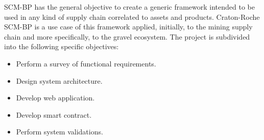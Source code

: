 \label{chap:Technical}

\acresetall 

\ac{SCM-BP} has the general objective to create a generic framework intended to be used in any kind of supply chain correlated to assets and products. Craton-Roche SCM-BP is a use case of this framework applied, initially, to the mining supply chain and more specifically, to the gravel ecosystem. The project is subdivided into the following specific objectives:
\begin{itemize}
\item Perform a survey of functional requirements.
\item Design system architecture.
\item Develop web application.
\item Develop smart contract.
\item Perform system validations.
\end{itemize}




%


